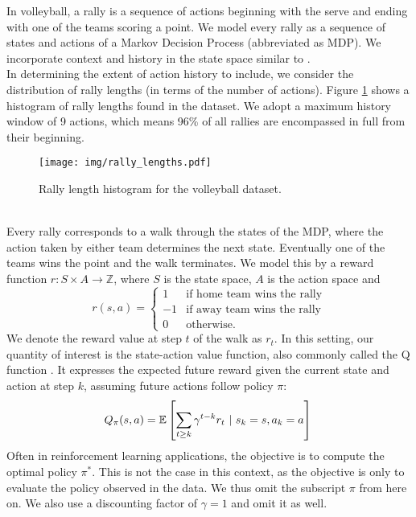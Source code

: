 \documentclass{sfuthesis}
\begin{document}
	In volleyball, a rally is a sequence of actions beginning with the serve and ending with one of the teams scoring a point. We model every rally as a sequence of states and actions of a Markov Decision Process (abbreviated as MDP). We incorporate context and history in the state space similar to \cite{schulte2017markov}.\\
	In determining the extent of action history to include, we consider the distribution of rally lengths (in terms of the number of actions). Figure \ref{fig:rally-lengths} shows a histogram of rally lengths found in the dataset. We adopt a maximum history window of 9 actions, which means 96\% of all rallies are encompassed in full from their beginning.\\
	\begin{figure}
		\texttt{[image: img/rally\_lengths.pdf]}
		\caption{Rally length histogram for the volleyball dataset.}
		\label{fig:rally-lengths}
	\end{figure}
	\\
	Every rally corresponds to a walk through the states of the MDP, where the action taken by either team determines the next state. Eventually one of the teams wins the point and the walk terminates. We model this by a reward function $r: S \times A \rightarrow \mathbb{Z}$, where $S$ is the state space, $A$ is the action space and
	\begin{equation}
		r(s,a) =
		\begin{cases} 
			1 & \text{if home team wins the rally} \\
			-1 & \text{if away team wins the rally} \\
			0 & \text{otherwise.} 
		\end{cases}
		\label{eq:reward_function}
	\end{equation}
	We denote the reward value at step $t$ of the walk as $r_t$. In this setting, our quantity of interest is the state-action value function, also commonly called the Q function \cite{sutton2018reinforcement}. It expresses the expected future reward given the current state and action at step $k$, assuming future actions follow policy $\pi$:
	\begin{equation}
		Q_\pi(s,a) = \mathbb{E} \left[ \sum_{t \ge k} \gamma^{t-k} r_{t} \ | \ s_k = s, a_k = a \right]\\
		\label{eq:qfunction}
	\end{equation}
	Often in reinforcement learning applications, the objective is to compute the optimal policy $\pi^*$. This is not the case in this context, as the objective is only to evaluate the policy observed in the data. We  thus omit the subscript $\pi$ from here on. We also use a discounting factor of $\gamma=1$ and omit it as well.
		
\end{document}
